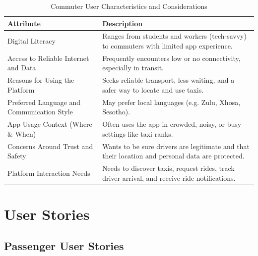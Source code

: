 \documentclass[a4paper,12pt]{article}
\begin{document}
\begin{table}[H]
\centering
\begin{tabular}{|p{5cm}|p{10cm}|}
\hline
\textbf{Attribute} & \textbf{Description} \\
\hline
Digital Literacy & Ranges from students and workers (tech-savvy) to commuters with limited app experience. \\
\hline
Access to Reliable Internet and Data & Frequently encounters low or no connectivity, especially in transit. \\
\hline
Reasons for Using the Platform & Seeks reliable transport, less waiting, and a safer way to locate and use taxis. \\
\hline
Preferred Language and Communication Style & May prefer local languages (e.g. Zulu, Xhosa, Sesotho). \\
\hline
App Usage Context (Where \& When) & Often uses the app in crowded, noisy, or busy settings like taxi ranks. \\
\hline
Concerns Around Trust and Safety & Wants to be sure drivers are legitimate and that their location and personal data are protected. \\
\hline
Platform Interaction Needs & Needs to discover taxis, request rides, track driver arrival, and receive ride notifications. \\
\hline
\end{tabular}
\caption{Commuter User Characteristics and Considerations}
\label{tab:commuter-characteristics}
\end{table}

\section{User Stories}

\subsection{Passenger User Stories}
\end{document}
